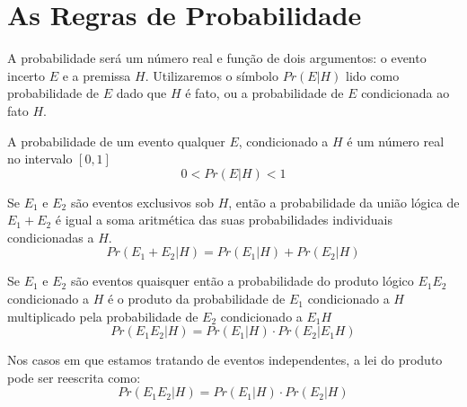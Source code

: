 \section{As Regras de Probabilidade}

A probabilidade será um número real e função de dois argumentos: o evento incerto $E$ e a premissa $H$. Utilizaremos o símbolo $Pr(E|H)$ lido como probabilidade de $E$ dado que $H$ é fato, ou a probabilidade de $E$ condicionada ao fato $H$.

\begin{tcolorbox}[colback=blue!5,colframe=blue!75!black,title=A Lei da convexidade]
    A probabilidade de um evento qualquer $E$, condicionado a $H$ é um número real no intervalo $[0,1]$
    \begin{equation}
        0<Pr(E|H)<1
    \end{equation}
\end{tcolorbox}

\begin{tcolorbox}[colback=blue!5,colframe=blue!75!black,title=A Lei da adição]
    Se $E_1$ e $E_2$ são eventos exclusivos sob $H$, então a probabilidade da união lógica de $E_1 + E_2$ é igual a soma aritmética das suas probabilidades individuais condicionadas a $H$.
    \begin{equation}
        Pr(E_1 + E_2 | H) = Pr(E_1|H) + Pr(E_2|H)
    \end{equation}
\end{tcolorbox}

\begin{tcolorbox}[colback=blue!5,colframe=blue!75!black,title=A Lei do produto]
    Se $E_1$ e $E_2$ são eventos quaisquer então a probabilidade do produto lógico $E_1 E_2$ condicionado a $H$ é o produto da probabilidade de $E_1$ condicionado a $H$ multiplicado pela probabilidade de $E_2$ condicionado a $E_1 H$
    \begin{equation}
        Pr(E_1 E_2 | H) = Pr(E_1|H) \cdot Pr(E_2|E_1 H)
    \end{equation}
\end{tcolorbox}

Nos casos em que estamos tratando de eventos independentes, a lei do produto pode ser reescrita como:
\begin{equation}
    Pr(E_1 E_2 | H) = Pr(E_1|H) \cdot Pr(E_2|H)
\end{equation}
